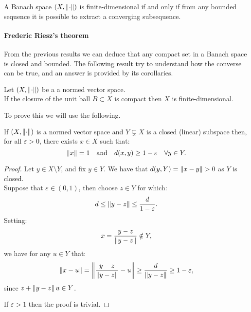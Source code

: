 \begin{theo} \label{characterization-finite-banach-theo}
	A Banach space $(X,\left\lVert\cdot\right\rVert)$ is finite-dimensional if and only if from any bounded sequence it is possible to extract a converging subsequence.
\end{theo}

\paragraph{Frederic Riesz's theorem}\footnotemark{} From the previous results we can deduce that any compact set in a Banach space is closed and bounded. The following result try to understand how the  converse can be true, and an answer is provided by its corollaries.

\begin{theo}\label{theorem-riesz}
	Let $(X, \left\lVert\cdot\right\rVert)$ be a a normed vector space.\\
	If the closure of the unit ball $B \subset X$ is compact then $X$ is finite-dimensional.
\end{theo}

To prove this we will use the following.

\begin{lemm}
	If $(X, \left\lVert\cdot\right\rVert)$ is a normed vector space and $Y \subsetneq X$ is a closed (linear) subspace then, for all $\varepsilon > 0$, there exists $x \in X$ such that:
	$$
	\left\lVert x\right\rVert 
	= 1 
	\quad \text{and} 
	\quad d(x,y) 
	\geq 1 - \varepsilon
	\quad \forall y \in Y
	.
	$$
\end{lemm} 

\begin{proof}
	Let $y \in X \setminus Y$, and fix $y \in Y$. We have that $d(y,Y) = \left\lVert x -y\right\rVert > 0$ as $Y$ is closed.\\
	Suppose that $\varepsilon \in (0,1)$, then choose $z \in Y$ for which:
	$$ 
	d
	\leq \left\lVert y-z\right\rVert 
	\leq \frac{d}{1-\varepsilon}
	.
	$$
	Setting:
	$$
	x 
	= \frac{y-z}{\left\lVert y-z\right\rVert}
	\notin Y,
	$$
	we have for any $u \in Y$ that:
	$$ 
	\left\lVert x-u\right\rVert 
	= \left\lVert \frac{y-z}{\left\lVert y-z\right\rVert} - u \right\rVert 
	\geq \frac{d}{\left\lVert y-z\right\rVert} 
	\geq 1-\varepsilon
	,
	$$
	since $z + \left\lVert y-z\right\rVert u \in Y$.
	
	If $\varepsilon > 1$ then the proof is trivial.
\end{proof} 

